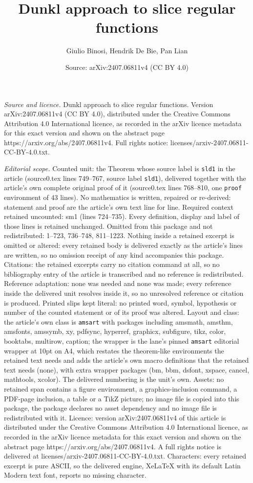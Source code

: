 \documentclass[10pt,a4paper]{amsart}
\title[Dunkl approach to slice regular functions]{Dunkl approach to slice regular functions}
\author{Giulio Binosi, Hendrik De Bie, Pan Lian}
\date{Source: arXiv:2407.06811v4 (CC BY 4.0)}
\begin{document}
\maketitle

\noindent\emph{Source and licence.} Dunkl approach to slice regular functions. Version arXiv:2407.06811v4 (CC BY 4.0), distributed under the Creative Commons Attribution 4.0 International licence, as recorded in the arXiv licence metadata for this exact version and shown on the abstract page https://arxiv.org/abs/2407.06811v4. Full rights notice: licenses/arxiv-2407.06811-CC-BY-4.0.txt.\par\smallskip

\noindent\textit{Editorial scope.} Counted unit: the Theorem whose source label is \texttt{sld1} in the article (source0.tex lines 749--767, source label \texttt{sld1}), delivered together with the article's own complete original proof of it (source0.tex lines 768--810, one \texttt{proof} environment of 43 lines). No mathematics is written, repaired or re-derived: statement and proof are the article's own text line for line. Required context retained uncounted: sm1 (lines 724--735). Every definition, display and label of those lines is retained unchanged. Omitted from this package and not redistributed: 1--723, 736--748, 811--1223. Nothing inside a retained excerpt is omitted or altered: every retained body is delivered exactly as the article's lines are written, so no omission receipt of any kind accompanies this package. Citations: the retained excerpts carry no citation command at all, so no bibliography entry of the article is transcribed and no reference is redistributed. Reference adaptation: none was needed and none was made; every reference inside the delivered unit resolves inside it, so no unresolved reference or citation is produced. Printed slips kept literal: no printed word, symbol, hypothesis or number of the counted statement or of its proof was altered. Layout and class: the article's own class is \texttt{amsart} with packages including amsmath, amsthm, amsfonts, amssymb, xy, pdfsync, hyperref, graphicx, subfigure, tikz, color, booktabs, multirow, caption; the wrapper is the lane's pinned \texttt{amsart} editorial wrapper at 10pt on A4, which restates the theorem-like environments the retained text needs and adds the article's own macro definitions that the retained text needs (none), with extra wrapper packages (bm, bbm, dsfont, xspace, cancel, mathtools, xcolor). The delivered numbering is the unit's own. Assets: no retained span contains a figure environment, a graphics-inclusion command, a PDF-page inclusion, a table or a TikZ picture; no image file is copied into this package, the package declares no asset dependency and no image file is redistributed with it. Licence: version arXiv:2407.06811v4 of this article is distributed under the Creative Commons Attribution 4.0 International licence, as recorded in the arXiv licence metadata for this exact version and shown on the abstract page https://arxiv.org/abs/2407.06811v4. A full rights notice is delivered at licenses/arxiv-2407.06811-CC-BY-4.0.txt. Characters: every retained excerpt is pure ASCII, so the delivered engine, XeLaTeX with its default Latin Modern text font, reports no missing character.
\end{document}
